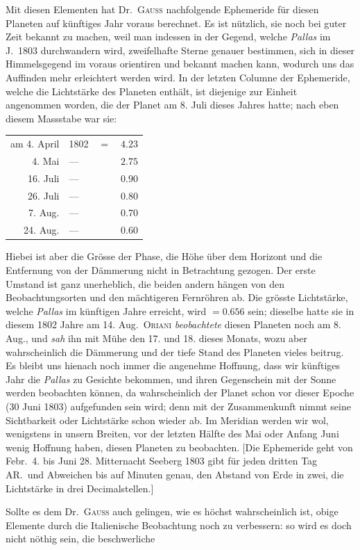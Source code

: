 Mit diesen Elementen hat Dr.\ \textsc{Gauss} nachfolgende Ephemeride für diesen Planeten auf künftiges Jahr voraus berechnet. Es ist nützlich, sie noch bei guter Zeit bekannt zu machen, weil man indessen in der Gegend, welche \textit{Pallas} im J.\ 1803 durchwandern wird, zweifelhafte Sterne genauer bestimmen, sich in dieser Himmelsgegend im voraus orientiren und bekannt machen kann, wodurch uns das Auffinden mehr erleichtert werden wird. In der letzten Columne der Ephemeride, welche die Lichtstärke des Planeten enthält, ist diejenige zur Einheit angenommen worden, die der Planet am 8. Juli dieses Jahres hatte; nach eben diesem Massstabe war sie:
\begin{center}
\begin{tabular}{r l l r}
am 4. April&1802&$=$&$4.23$\\
4. Mai&—&&$2.75$\\
16. Juli&—&&$0.90$\\
26. Juli&—&&$0.80$\\
7. Aug.&—&&$0.70$\\
24. Aug.&—&&$0.60$
\end{tabular}
\end{center}
Hiebei ist aber die Grösse der Phase, die Höhe über dem Horizont und die Entfernung von der Dämmerung nicht in Betrachtung gezogen. Der erste Umstand ist ganz unerheblich, die beiden andern hängen von den Beobachtungsorten und den mächtigeren Fernröhren ab. Die grösste Lichtstärke, welche \textit{Pallas} im künftigen Jahre erreicht, wird $=0.656$ sein; dieselbe hatte sie in diesem 1802 Jahre am 14. Aug.\ \textsc{Oriani} \textit{beobachtete} diesen Planeten noch am 8. Aug., und \textit{sah} ihn mit Mühe den 17. und 18. dieses Monats, wozu aber wahrscheinlich die Dämmerung und der tiefe Stand des Planeten vieles beitrug. Es bleibt uns hienach noch immer die angenehme Hoffnung, dass wir künftiges Jahr die \textit{Pallas} zu Gesichte bekommen, und ihren Gegenschein mit der Sonne werden beobachten können, da wahrscheinlich der Planet schon vor dieser Epoche (30 Juni 1803) aufgefunden sein wird; denn mit der Zusammenkunft nimmt seine Sichtbarkeit oder Lichtstärke schon wieder ab. Im Meridian werden wir wol, wenigstens in unsern Breiten, vor der letzten Hälfte des Mai oder Anfang Juni wenig Hoffnung haben, diesen Planeten zu beobachten. [Die Ephemeride geht von Febr.\ 4. bis Juni 28. Mitternacht Seeberg 1803 gibt für jeden dritten Tag AR.\ und Abweichen bis auf Minuten genau, den Abstand von Erde in zwei, die Lichtstärke in drei Decimalstellen.]

Sollte es dem Dr.\ \textsc{Gauss} auch gelingen, wie es höchst wahrscheinlich ist, obige Elemente durch die Italienische Beobachtung noch zu verbessern: so wird es doch nicht nöthig sein, die beschwerliche
